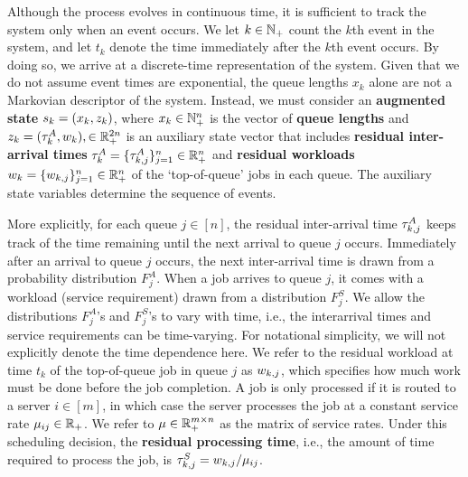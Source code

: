 Although the process evolves in continuous time, it is sufficient to track the system only when an event occurs. We let $k\in \mathbb{N}_{+}$ count the $k$th event in the system, and let $t_{k}$ denote the time immediately after the $k$th event occurs. By doing so, we arrive at a discrete-time representation of the system. Given that we do not assume event times are exponential, the queue lengths $x_{k}$ alone are not a Markovian descriptor of the system. Instead, we must consider an  {\bf augmented state} $s_{k} = (x_{k}, z_{k})$, where $x_k \in \mathbb{N}^{n}_{+}$ is the vector of {\bf queue lengths} and $z_{k} = (\tau_{k}^{A}, w_{k}),\in \mathbb{R}^{2n}_{+}$ is an auxiliary state vector that includes {\bf residual inter-arrival times} $\tau_{k}^{A} = \{ \tau^{A}_{k,j} \}_{j = 1}^{n} \in \mathbb{R}^{n}_{+}$ and {\bf residual workloads} $w_{k} = \{ w_{k,j} \}_{j = 1}^{n} \in \mathbb{R}^{n}_{+}$ of the `top-of-queue' jobs in each queue. The auxiliary state variables determine the sequence of events.

More explicitly, for each queue $j\in[n]$, the residual inter-arrival time $\tau^{A}_{k,j}$ keeps track of the time remaining until the next arrival to queue $j$ occurs. Immediately after an arrival to queue $j$ occurs, the next inter-arrival time is drawn from a probability distribution $F_{j}^{A}$. When a job arrives to queue $j$, it comes with a workload (service requirement) drawn from a distribution $F_{j}^{S}$. We allow the distributions $F_{j}^{A}$'s and $F_{j}^{S}$'s to vary with time, i.e., the interarrival times and service requirements can be time-varying. For notational simplicity, we will not explicitly denote the time dependence here. We refer to the residual workload at time $t_{k}$ of the top-of-queue job in queue $j$ as $w_{k,j}$, which specifies how much work must be done before the job completion. A job is only processed if it is routed to a server $i\in[m]$, in which case the server processes the job at a constant service rate $\mu_{ij} \in \mathbb{R}_{+}$. We refer to $\mu \in \mathbb{R}_{+}^{m \times n}$  as the matrix of service rates.
Under this scheduling decision, the \textbf{residual processing time}, i.e., the amount of time required
to process the job, is $\tau^{S}_{k,j}= w_{k,j}/\mu_{ij}$. 


